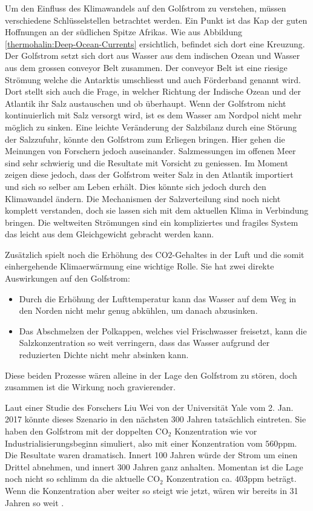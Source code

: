 Um den Einfluss des Klimawandels auf den Golfstrom zu verstehen, müssen verschiedene Schlüsselstellen betrachtet werden.
Ein Punkt ist das Kap der guten Hoffnungen an der südlichen Spitze Afrikas.
Wie aus Abbildung \ref{thermohalin:Deep-Ocean-Currents} ersichtlich, befindet sich dort eine Kreuzung.
Der Golfstrom setzt sich dort aus Wasser aus dem indischen Ozean und Wasser aus dem grossen conveyor Belt zusammen. Der conveyor Belt ist eine riesige Strömung welche die Antarktis umschliesst und auch Förderband genannt wird.
Dort stellt sich auch die Frage, in welcher Richtung der Indische Ozean und der Atlantik ihr Salz austauschen und ob überhaupt. Wenn der Golfstrom nicht kontinuierlich mit Salz versorgt wird, ist es dem Wasser am Nordpol nicht mehr möglich zu sinken. Eine leichte Veränderung der Salzbilanz durch eine Störung der Salzzufuhr, könnte den Golfstrom zum Erliegen bringen. Hier gehen die Meinungen von Forschern jedoch auseinander. Salzmessungen im offenen Meer sind sehr schwierig und die Resultate mit Vorsicht zu geniessen.
Im Moment zeigen diese jedoch, dass der Golfstrom weiter Salz in den Atlantik importiert und sich so selber am Leben erhält. Dies könnte sich jedoch durch den Klimawandel ändern. Die Mechanismen der Salzverteilung sind noch nicht komplett verstanden, doch sie lassen sich mit dem aktuellen Klima in Verbindung bringen. Die weltweiten Strömungen sind ein kompliziertes und fragiles System das leicht aus dem Gleichgewicht gebracht werden kann. 

Zusätzlich spielt noch die Erhöhung des CO2-Gehaltes in der Luft und die somit einhergehende Klimaerwärmung eine wichtige Rolle. Sie hat zwei direkte Auswirkungen auf den Golfstrom:

\begin{itemize}
	\item Durch die Erhöhung der Lufttemperatur kann das Wasser auf dem Weg in den Norden nicht mehr genug abkühlen, um danach abzusinken.
	\item Das Abschmelzen der Polkappen, welches viel Frischwasser freisetzt, kann die Salzkonzentration so weit verringern, dass das Wasser aufgrund der reduzierten Dichte nicht mehr absinken kann.
\end{itemize}

Diese beiden Prozesse wären alleine in der Lage den Golfstrom zu stören, doch zusammen ist die Wirkung noch gravierender.

Laut einer Studie des Forschers Liu Wei von der Universität Yale vom 2. Jan. 2017 \cite{thermohalin:liuwei} könnte dieses Szenario in den nächsten 300 Jahren tatsächlich eintreten. Sie haben den Golfstrom mit der doppelten $\text{CO}_2$ Konzentration wie vor Industrialisierungsbeginn simuliert, also mit einer Konzentration vom $560\text{ppm}$. Die Resultate waren dramatisch. Innert 100 Jahren würde der Strom um einen Drittel abnehmen, und innert 300 Jahren ganz anhalten. Momentan ist die Lage noch nicht so schlimm da die aktuelle $\text{CO}_2$ Konzentration ca. $403\text{ppm}$\cite{thermohalin:co2} beträgt. Wenn die Konzentration aber weiter so steigt wie jetzt, wären wir bereits in 31 Jahren so weit .

